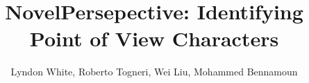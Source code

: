 \documentclass[a0paper, landscape]{tikzposter}
\title{NovelPersepective: Identifying Point of View Characters}
\author{Lyndon White, Roberto Togneri, Wei Liu, Mohammed Bennamoun}
\institute{Contact: lyndon.white@research.uwa.edu.au}
\date{}
\begin{document}
\maketitle

\begin{columns}
\end{columns}
\end{document}
